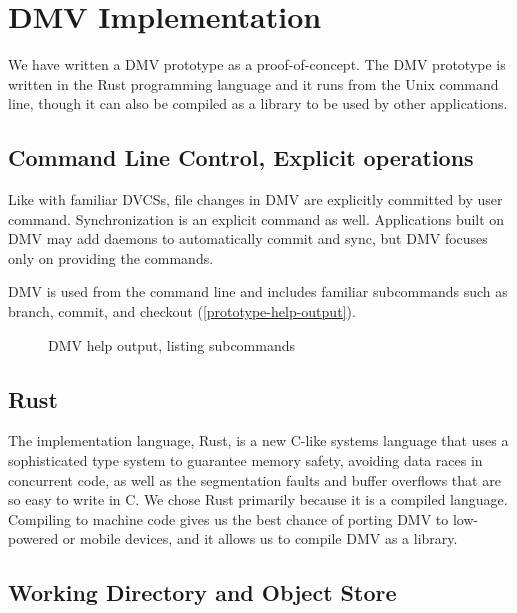\chapter{DMV Implementation}

We have written a \gls{DMV} prototype as a proof-of-concept. The \gls{DMV}
prototype is written in the Rust programming language and it runs from the Unix
command line, though it can also be compiled as a library to be used by other
applications.


\section{Command Line Control, Explicit operations}

Like with familiar \glspl{DVCS}, file changes in \gls{DMV} are explicitly
committed by user command. Synchronization is an explicit command as well.
Applications built on \gls{DMV} may add daemons to automatically \gls{commit}
and sync, but \gls{DMV} focuses only on providing the commands.

\gls{DMV} is used from the command line and includes familiar subcommands such
as branch, \gls{commit}, and checkout
(\autoref{prototype-help-output}).

\begin{figure}[h]
    \caption{DMV help output, listing subcommands}
    \label{prototype-help-output}
    
\end{figure}



\section{Rust}

The implementation language, Rust, is a new C-like systems language that uses a
sophisticated type system to guarantee memory safety,
avoiding data races in concurrent code, as well as the segmentation faults and
buffer overflows that are so easy to write in C. We chose Rust primarily because
it is a compiled language. Compiling to machine code gives us the best chance of
porting \gls{DMV} to low-powered or mobile devices,
and it allows us to compile DMV as a library.



\section{Working Directory and Object Store}\label{dir-impl}

